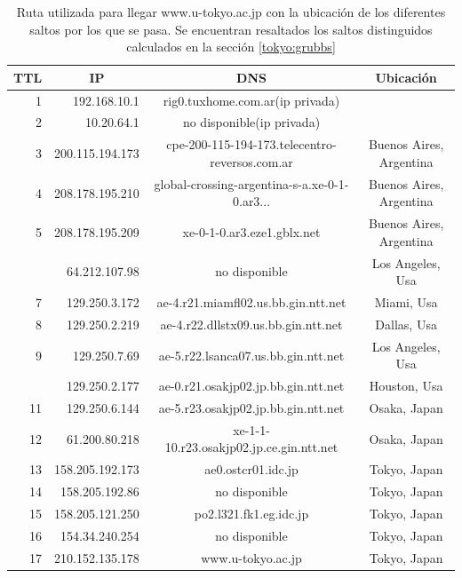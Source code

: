 \begin{table}[H]
    \begin{center}
        \begin{tabular}{| r | r | c | c |}
  \hline
  {\bf TTL} & \multicolumn{1}{|c|}{\bf IP} & {\bf DNS} & {\bf Ubicación}\\
  \hline
\hline 1  & 192.168.10.1 & rig0.tuxhome.com.ar(ip privada) &\\
\hline 2  & 10.20.64.1 & no disponible(ip privada) &\\
\hline 3  & 200.115.194.173 & cpe-200-115-194-173.telecentro-reversos.com.ar & Buenos Aires, Argentina\\
\hline 4  & 208.178.195.210 & global-crossing-argentina-s-a.xe-0-1-0.ar3... & Buenos Aires, Argentina \\
\hline 5  & 208.178.195.209 & xe-0-1-0.ar3.eze1.gblx.net & Buenos Aires, Argentina \\
\rowcolor{blue!25}\hline 6  & 64.212.107.98 & no disponible  & Los Angeles, Usa\\
\hline 7  & 129.250.3.172 & ae-4.r21.miamfl02.us.bb.gin.ntt.net & Miami, Usa \\
\hline 8  & 129.250.2.219 & ae-4.r22.dllstx09.us.bb.gin.ntt.net & Dallas, Usa\\
\hline 9  & 129.250.7.69 & ae-5.r22.lsanca07.us.bb.gin.ntt.net & Los Angeles, Usa\\
\rowcolor{blue!25}\hline 10  & 129.250.2.177 & ae-0.r21.osakjp02.jp.bb.gin.ntt.net & Houston, Usa\\
\hline 11  & 129.250.6.144 & ae-5.r23.osakjp02.jp.bb.gin.ntt.net & Osaka, Japan\\
\hline 12  & 61.200.80.218 & xe-1-1-10.r23.osakjp02.jp.ce.gin.ntt.net & Osaka, Japan\\
\hline 13  & 158.205.192.173 & ae0.ostcr01.idc.jp & Tokyo, Japan\\
\hline 14  & 158.205.192.86 & no disponible  & Tokyo, Japan\\
\hline 15  & 158.205.121.250 & po2.l321.fk1.eg.idc.jp & Tokyo, Japan\\
\hline 16  & 154.34.240.254 & no disponible & Tokyo, Japan\\
\hline 17  & 210.152.135.178 & www.u-tokyo.ac.jp & Tokyo, Japan\\
\hline
        \end{tabular}
        \caption{Ruta utilizada para llegar www.u-tokyo.ac.jp con la ubicación de los diferentes saltos por los que se pasa. Se encuentran resaltados los saltos distinguidos calculados en la sección \ref{tokyo:grubbs}}
        \label{table:tokyo} 
    \end{center}
\end{table}

